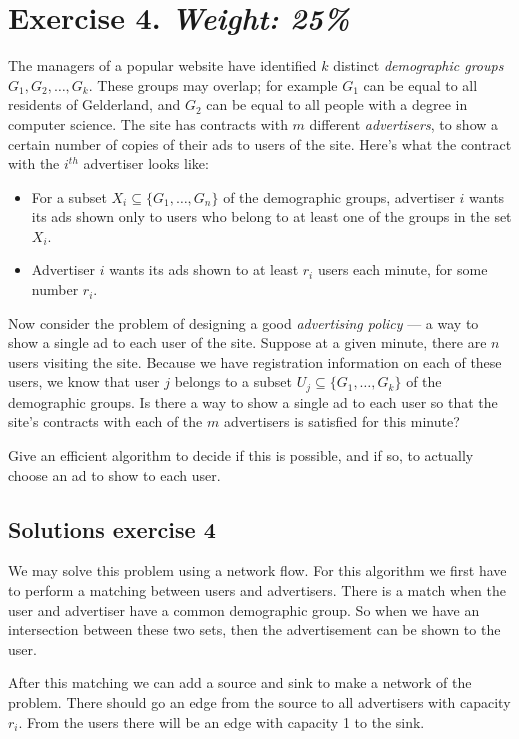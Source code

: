 \documentclass{article}
\begin{document}
\section*{Exercise 4. \textit{Weight: 25\%}}
The managers of a popular website have identified $k$ distinct \emph{demographic groups} $G_1, G_2 ,\ldots, G_k$.
These groups may overlap; for example $G_1$ can be equal to all residents of Gelderland, and $G_2$ can be equal
to all people with a degree in computer science.
The site has contracts with $m$ different \emph{advertisers}, to show a certain number of copies of their ads to users
of the site. Here's what the contract with the $i^{th}$ advertiser looks like:
\begin{itemize}
\item
For a subset $X_i \subseteq \{ G_1 ,\ldots, G_n \}$ of the demographic groups, advertiser $i$ wants its ads shown only to
users who belong to at least one of the groups in the set $X_i$.
\item
Advertiser $i$ wants its ads shown to at least $r_i$ users each minute, for some number $r_i$.
\end{itemize}

Now consider the problem of designing a good \emph{advertising policy} --- a way to show a single ad to each user of the site.
Suppose at a given minute, there are $n$ users visiting the site.
Because we have registration information on each of these users, we know that user $j$ belongs to a subset
$U_j \subseteq \{ G_1 ,\ldots, G_k \}$ of the demographic groups.
Is there a way to show a single ad to each user so that the site's contracts with each of the $m$ advertisers is satisfied
for this minute?

Give an efficient algorithm to decide if this is possible, and if so, to actually choose an ad to show to each user.

\subsection*{Solutions exercise 4}
We may solve this problem using a network flow. For this algorithm we first have to perform a matching between users and advertisers. There is a match when the user and advertiser have a common demographic group. So when we have an intersection between these two sets, then the advertisement can be shown to the user.

After this matching we can add a source and sink to make a network of the problem. There should go an edge from the source to all advertisers with capacity $r_i$. From the users there will be an edge with capacity 1 to the sink.
\end{document}
